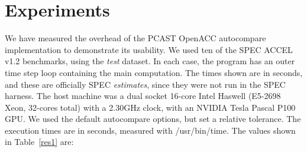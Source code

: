 \section{Experiments}

We have measured the overhead of the PCAST OpenACC autocompare implementation to demonstrate its usability.
We used ten of the SPEC ACCEL v1.2 benchmarks, using the \emph{test} dataset.
In each case, the program has an outer time step loop containing the main computation.
The times shown are in seconds, and these are officially SPEC \emph{estimates}, since they were not run in the SPEC harness.
The host machine was a dual socket 16-core Intel Haswell (E5-2698 Xeon, 32-cores total) with a 2.30GHz clock, with an NVIDIA Tesla Pascal P100 GPU.
We used the default autocompare options, but set a relative tolerance.
The execution times are in seconds, measured with /usr/bin/time. The values shown in Table~\ref{res1} are:


